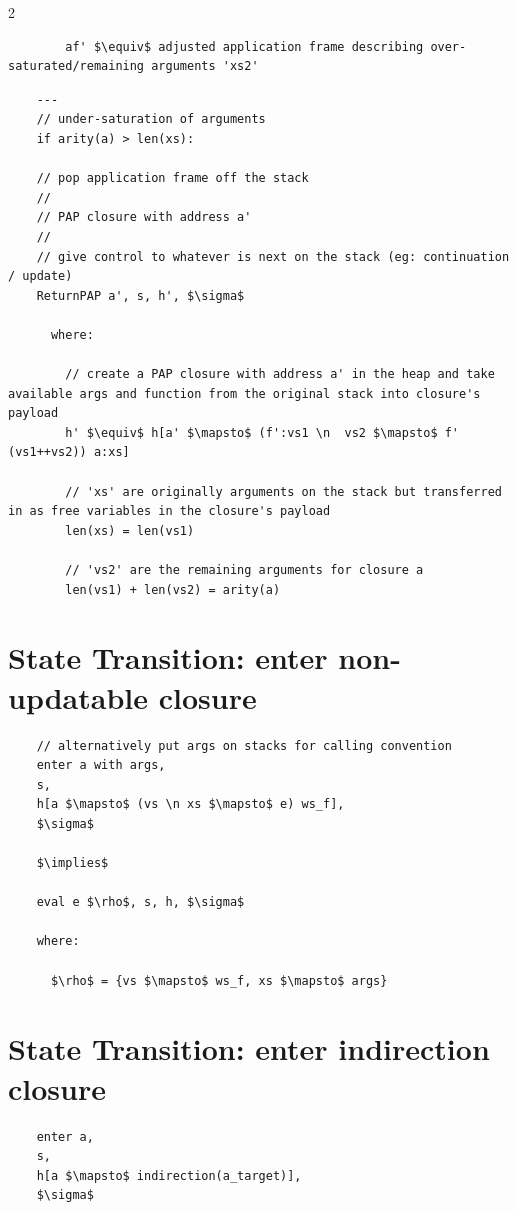 \documentclass[8pt]{extarticle}
\begin{document}
\begin{multicols*}{2}
\begin{lstlisting}
        af' $\equiv$ adjusted application frame describing over-saturated/remaining arguments 'xs2'

  \end{lstlisting}
      
  \vfill\null
  \columnbreak
  
  \begin{lstlisting}
    ---
    // under-saturation of arguments
    if arity(a) > len(xs):

    // pop application frame off the stack
    //
    // PAP closure with address a'
    //
    // give control to whatever is next on the stack (eg: continuation / update)
    ReturnPAP a', s, h', $\sigma$

      where:

        // create a PAP closure with address a' in the heap and take available args and function from the original stack into closure's payload
        h' $\equiv$ h[a' $\mapsto$ (f':vs1 \n  vs2 $\mapsto$ f' (vs1++vs2)) a:xs]

        // 'xs' are originally arguments on the stack but transferred in as free variables in the closure's payload
        len(xs) = len(vs1)

        // 'vs2' are the remaining arguments for closure a
        len(vs1) + len(vs2) = arity(a)
  \end{lstlisting}

  \section{State Transition: enter non-updatable closure}

  \begin{lstlisting}
    // alternatively put args on stacks for calling convention
    enter a with args,
    s,
    h[a $\mapsto$ (vs \n xs $\mapsto$ e) ws_f],
    $\sigma$

    $\implies$

    eval e $\rho$, s, h, $\sigma$

    where:

      $\rho$ = {vs $\mapsto$ ws_f, xs $\mapsto$ args}
  \end{lstlisting}

  \section{State Transition: enter indirection closure}

  \begin{lstlisting}
    enter a,
    s,
    h[a $\mapsto$ indirection(a_target)],
    $\sigma$


\end{lstlisting}
\end{multicols*}
\end{document}
